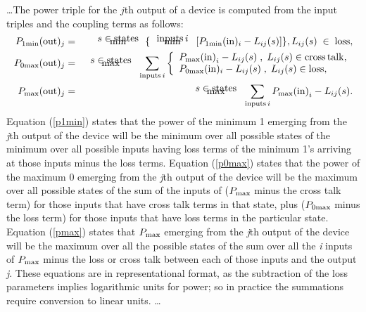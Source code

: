 \ldots The power triple for the $j$th output of a device is computed from
the input triples and the coupling terms as follows:
\begin{eqnarray}                           
P_{1\rm min}({\rm out})_j & = & \begin{array}[t]{c} {\rm min} \\[-15pt]
{s\in\rm states} \end{array}\, \{ \,  \begin{array}[t]{c}{\rm min}
\\[-15pt] {\rm inputs}\, i \end{array} \;  [P_{1\rm min}({\rm in})_i -
L_{ij}(s)]\}, L_{ij}(s) \; \in \;  {\rm loss},\label{p1min} \\ P_{0\rm
max}({\rm out})_j & =& \begin{array}[t]{c}{\rm max} \\[-15pt] {s\in\rm
states} \end{array}\, \sum_{{\rm inputs}\, i}\left\{ \begin{array}{l}P_{\rm
max}{\rm (in)}_i - L_{ij}(s)\;  ,\; L_{ij}(s)\in {\rm cross\,
talk},\label{p0max} \\  P_{0\rm max}({\rm in})_i - L_{ij}(s)\; ,\;
L_{ij}(s)\in {\rm loss},   \end{array} \right. \\ P_{\rm max}({\rm out})_j
&=& \begin{array}[t]{c}{\rm max} \\[-15pt] {s\in\rm states} \end{array}\,
\sum_{{\rm inputs}\, i}  P_{\rm max}{\rm (in)}_i - L_{ij}(s) . \label{pmax}
\end{eqnarray}      
Equation (\ref{p1min}) states that the power of the minimum 1 emerging from
the {\it j}th output of the device will be the minimum over all possible
states of the minimum over all possible inputs having loss terms of the
minimum 1's arriving at those inputs minus the loss terms. Equation
(\ref{p0max}) states that the power of the maximum 0 emerging from the {\it
j}th output of the device will be the maximum over all possible states of
the sum of the inputs of ($P_{\rm max} $ minus the cross talk term) for
those inputs that have cross talk terms in that state, plus ($P_{0\rm max}
$ minus the loss term) for those inputs that have loss terms in the
particular state.  Equation (\ref{pmax}) states that $ P_{\rm max} $
emerging from the {\it j}th output of the device will be the maximum over
all the possible states of the sum over all the {\it i} inputs of $ P_{\rm
max} $ minus the loss or cross talk between each of those inputs and the
output {\it j}.  These equations are in representational format, as the
subtraction of the loss parameters implies logarithmic units for power; so
in practice the summations require conversion to linear units.  \ldots

